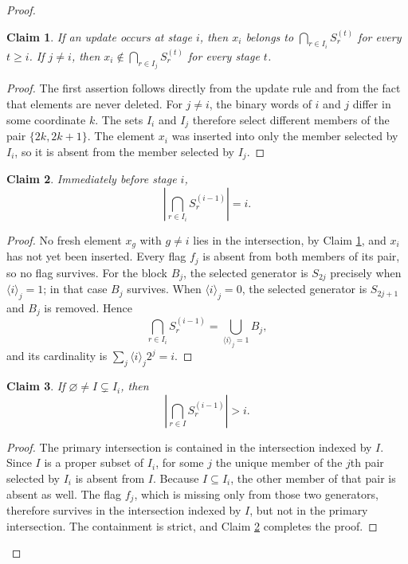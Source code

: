 \documentclass[11pt]{article}
\newtheorem{claim}[claim]{Claim}
\theoremstyle{definition}
\theoremstyle{remark}
\begin{document}
\begin{proof}
\begin{claim}\label{clm:fresh-element-separation}
If an update occurs at stage $i$, then $x_i$ belongs to
$\bigcap_{r\in I_i}S_r^{(t)}$ for every $t\ge i$. If $j\ne i$, then
$x_i\notin\bigcap_{r\in I_j}S_r^{(t)}$ for every stage $t$.
\end{claim}

\begin{proof}
The first assertion follows directly from the update rule and from the fact
that elements are never deleted. For $j\ne i$, the binary words of $i$ and
$j$ differ in some coordinate $k$. The sets $I_i$ and $I_j$ therefore select
different members of the pair $\{2k,2k+1\}$. The element $x_i$ was inserted
into only the member selected by $I_i$, so it is absent from the member
selected by $I_j$.
\end{proof}

\begin{claim}\label{clm:primary-intersection-size}
Immediately before stage $i$,
\[
  \left|\bigcap_{r\in I_i}S_r^{(i-1)}\right|=i.
\]
\end{claim}

\begin{proof}
No fresh element $x_g$ with $g\ne i$ lies in the intersection, by Claim 
\ref {clm:fresh-element-separation}, and $x_i$ has not yet been inserted.
Every flag $f_j$ is absent from both members of its pair, so no flag survives.
For the block $B_j$, the selected generator is $S_{2j}$ precisely when
$\langle i\rangle_j=1$; in that case $B_j$ survives. When
$\langle i\rangle_j=0$, the selected generator is $S_{2j+1}$ and $B_j$ is
removed. Hence
\[
  \bigcap_{r\in I_i}S_r^{(i-1)}
  =\bigcup_{\langle i\rangle_j=1}B_j,
\]
and its cardinality is $\sum_j\langle i\rangle_j2^j=i$.
\end{proof}

\begin{claim}\label{clm:nonprimary-larger}
If $\varnothing\ne I\subsetneq I_i$, then
\[
  \left|\bigcap_{r\in I}S_r^{(i-1)}\right|>i.
\]
\end{claim}

\begin{proof}
The primary intersection is contained in the intersection indexed by $I$.
Since $I$ is a proper subset of $I_i$, for some $j$ the unique member of the
$j$th pair selected by $I_i$ is absent from $I$. Because $I\subseteq I_i$,
the other member of that pair is absent as well. The flag $f_j$, which is
missing only from those two generators, therefore survives in the
intersection indexed by $I$, but not in the primary intersection. The
containment is strict, and  Claim \ref {clm:primary-intersection-size} completes the
proof.
\end{proof}


\end{proof}
\end{document}
